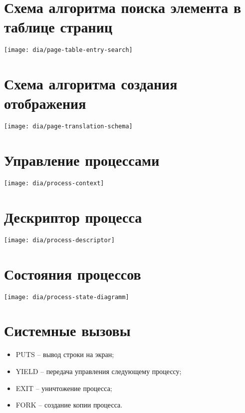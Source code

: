 \documentclass[12pt]{article}
\begin{document}
\section{\textbf{Схема алгоритма поиска элемента в таблице страниц}}
\begin{center}
\texttt{[image: dia/page-table-entry-search]}
\end{center}


\section{\textbf{Схема алгоритма создания отображения}}
\begin{center}
\texttt{[image: dia/page-translation-schema]}
\end{center}


\section{\textbf{Управление процессами}}
\begin{center}
\texttt{[image: dia/process-context]}
\end{center}


\section{\textbf{Дескриптор процесса}}
\begin{center}
\texttt{[image: dia/process-descriptor]}
\end{center}


\section{\textbf{Состояния процессов}}
\begin{center}
\texttt{[image: dia/process-state-diagramm]}
\end{center}


\section{\textbf{Системные вызовы}}
\begin{itemize}
\item PUTS -- вывод строки на экран;
\item YIELD -- передача управления следующему процессу;
\item EXIT -- уничтожение процесса;
\item FORK -- создание копии процесса.
\end{itemize}
\end{document}
